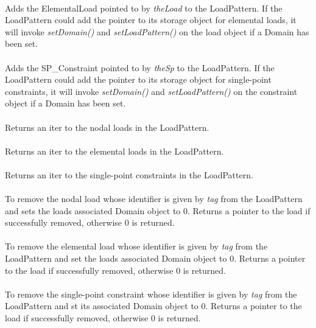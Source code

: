 \\
Adds the ElementalLoad pointed to by {\em theLoad} to the
LoadPattern. If the LoadPattern could add the pointer to its storage
object for elemental loads, it will invoke {\em setDomain()}
and {\em setLoadPattern()} on the load object if a Domain has been set. \\

\\ 
Adds the SP\_Constraint pointed to by {\em theSp} to the
LoadPattern. If the LoadPattern could add the pointer to its storage
object for single-point constraints, it will invoke {\em setDomain()}
and {\em setLoadPattern()} on the constraint object if a Domain has
been set. \\

\\
Returns an iter to the nodal loads in the LoadPattern. \\

\\
Returns an iter to the elemental loads in the LoadPattern. \\

\\ 
Returns an iter to the single-point constraints in the LoadPattern. \\
    
\\
To remove the nodal load whose identifier is given by {\em tag} from
the LoadPattern and sets the loads associated Domain object to
$0$. Returns a pointer to the load if successfully removed, otherwise
$0$ is returned. \\ 

\\
To remove the elemental load whose identifier is given by {\em tag} from
the LoadPattern and set the loads associated Domain object to
$0$. Returns a pointer to the load if successfully removed, otherwise
$0$ is returned. \\ 

\\ 
To remove the single-point constraint whose identifier is given by {\em tag} from
the LoadPattern and st its associated Domain object to $0$. Returns a
pointer to the load if successfully removed, otherwise $0$ is
returned. \\ 

